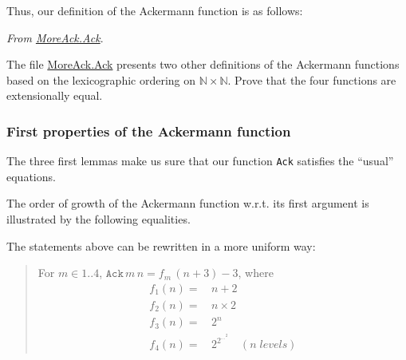 Thus, our definition of the Ackermann function is as follows:

\vspace{4pt}
\noindent
\emph{From \href{../theories/html/hydras.MoreAck.Ack.html}{MoreAck.Ack}}.





\begin{exercise}
The file \href{../theories/html/hydras.MoreAck.Ack.html}{MoreAck.Ack} presents two other definitions of the Ackermann functions based on the lexicographic ordering on $\mathbb{N}\times\mathbb{N}$.
Prove that the four functions are extensionally equal.
\end{exercise}


\subsubsection{First properties of the Ackermann function}

The three first lemmas make us sure that our function 
\texttt{Ack} satisfies the ``usual'' equations.




\vspace{4pt}

The order of growth of the Ackermann function w.r.t. its first argument is illustrated by the following equalities.







\begin{remark}
 The statements above can be rewritten in a more uniform way:

 \begin{quote}
   For $m\in 1..4$, $\texttt{Ack}\,m\,n = f_m\,(n+3)-3$, where 
   \begin{align*}
   f_1(n)=&\,n+2 \\
   f_2(n)=&\,n\times 2\\
   f_3(n)=&\,2^n\\
   f_4(n)=&\,2^{2^{\dots^2}}\quad(n\;\textit{levels})
   \end{align*}
 \end{quote}
\end{remark}


